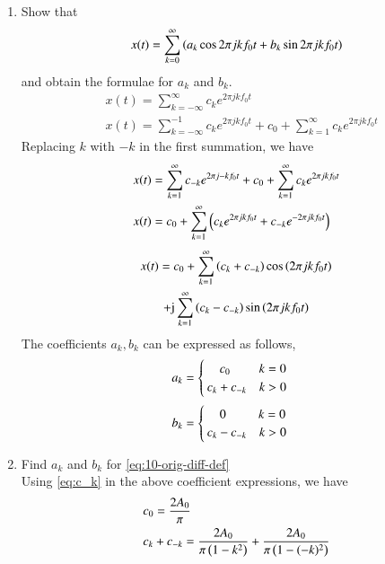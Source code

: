 \documentclass[journal,12pt,twocolumn]{IEEEtran}
\renewcommand\thesection{\arabic{section}}
\begin{document}
\begin{enumerate}[label=\thesection.\arabic*,ref=\thesection.\theenumi]
\item Show that 
\begin{align}
	x(t) = \sum_{k = 0}^{\infty}\left(a_k\cos{2\pi jkf_0 t}+b_k\sin{2\pi jkf_0 t}\right)
\label{eq:one-Z-real}
\end{align}
and obtain the formulae for $a_k$ and $b_k$.\\
\solution
\begin{align}
	&x(t) = \sum_{k = -\infty}^{\infty}c_ke^{2 \pi j kf_0 t} \\
	&x(t) = \sum_{k = -\infty}^{-1} c_k e^{2 \pi j kf_0 t} + c_0 + \sum_{k = 1}^{\infty} c_k e^{2 \pi j kf_0 t}
\end{align}
Replacing $k$ with $-k$ in the first summation, we have 
\begin{align}
	&x(t) = \sum_{k = 1}^{\infty} c_{-k} e^{2 \pi j -k f_0 t} + c_0 + \sum_{k = 1}^{\infty} c_k e^{2 \pi j kf_0 t} \\
	&x(t) = c_0 + \sum_{k = 1}^{\infty} \left(c_k e^{2 \pi j kf_0 t} + c_{-k} e^{-2 \pi jk f_0 t}\right)
\end{align}
\begin{multline}
	x(t) = c_0 + \sum_{k = 1}^{\infty} \left(c_k + c_{-k}\right) \cos{\ensuremath{\left(2 \pi j kf_0 t\right)}} \\ + \text{j} \sum_{k = 1}^{\infty} \left(c_k - c_{-k}\right) \sin{\ensuremath{\left(2 \pi j k f_0 t\right)}}
\end{multline}
The coefficients $a_k, b_k$ can be expressed as follows, 
\begin{align}
a_k = 
	\begin{cases}
		\quad c_0 \hspace{2.3em} k = 0 \\
		c_k + c_{-k} \quad k > 0
	\end{cases}
\end{align}
\begin{align}
b_k = 
	\begin{cases}
		\quad 0 \hspace{2.6em} k = 0 \\
	    	c_k - c_{-k} \quad k > 0
	\end{cases}
\end{align}


\item Find $a_k$ and $b_k$ for 
	\eqref{eq:10-orig-diff-def} \\
\solution
Using \eqref{eq:c_k} in the above coefficient expressions, we have 
\begin{align}
&c_0 = \frac{2 A_0}{\pi} \\
&c_k + c_{-k} = \frac{2 A_0}{\pi \left(1 - k^2\right)} + \frac{2 A_0}{\pi \left(1 - (-k)^2\right)}
\end{align}


\end{enumerate}
\end{document}
